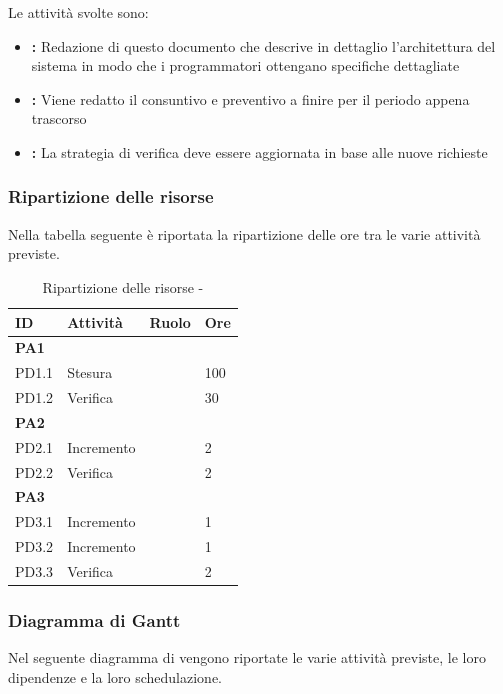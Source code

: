 \documentclass[12pt,a4paper]{article}
\begin{document}
Le attività svolte sono:

\begin{itemize}
	\item \textbf{\DP{}:}
        Redazione di questo documento che descrive in dettaglio l'architettura del 
        sistema in modo che i programmatori ottengano specifiche dettagliate
	\item \textbf{\PdP{}:} Viene redatto il consuntivo e preventivo a finire per il periodo appena trascorso
	\item \textbf{\PdQ{}:} La strategia di verifica deve essere aggiornata in base alle nuove richieste
\end{itemize}

\subsubsection{Ripartizione delle risorse}
Nella tabella seguente è riportata la ripartizione delle ore tra le varie attività previste.

\begin{table}[H]
	\begin{center}
		\begin{tabular}{p{} p{} p{} p{}}
			\toprule
			\textbf{ID}	& \textbf{Attività}	& \textbf{Ruolo} & \textbf{Ore}\\ \midrule
			\midrule
			\textbf{PA1} & \textbf{\DP{}} & &  \\ \midrule
			PD1.1 & Stesura & \PG{} & 100 \\ \midrule
			PD1.2 & Verifica & \VR{} & 30 \\ \midrule
			\textbf{PA2} & \textbf{\PdP{}} & &  \\ \midrule
			PD2.1 & Incremento & \RE{} & 2 \\ \midrule
			PD2.2 & Verifica & \VR{} & 2 \\ \midrule
			\textbf{PA3} & \textbf{\PdQ{}} & &  \\ \midrule
			PD3.1 & Incremento & \RE{} & 1 \\ \midrule
			PD3.2 & Incremento & \RE{} & 1 \\ \midrule
			PD3.3 & Verifica & \VR{} & 2 \\ \midrule
			\bottomrule
		\end{tabular}
		\caption{Ripartizione delle risorse - \FPD{}}
	\end{center}
\end{table}

\subsubsection{Diagramma di Gantt}
\label{gantt progettazione di dettaglio}
Nel seguente diagramma di  vengono riportate le varie attività previste, le loro dipendenze e la loro schedulazione.
\end{document}
